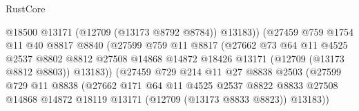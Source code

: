 \begin{lexlean}{RustCore}
\begin{coremodule}
                                      @18500
                                      @13171
                                      (@12709 (@13173 @8792 @8784))
                                      @13183))
                                  (@27459
                                    @759
                                    @1754
                                    @11
                                    @40
                                    @8817
                                    @8840
                                    (@27599
                                      @759
                                      @11
                                      @8817
                                      (@27662
                                        @73
                                        @64
                                        @11
                                        @4525
                                        @2537
                                        @8802
                                        @8812
                                        @27508
                                        @14868
                                        @14872
                                        @18426
                                        @13171
                                        (@12709 (@13173 @8812 @8803))
                                        @13183))
                                    (@27459
                                      @729
                                      @214
                                      @11
                                      @27
                                      @8838
                                      @2503
                                      (@27599
                                        @729
                                        @11
                                        @8838
                                        (@27662
                                          @171
                                          @64
                                          @11
                                          @4525
                                          @2537
                                          @8822
                                          @8833
                                          @27508
                                          @14868
                                          @14872
                                          @18119
                                          @13171
                                          (@12709 (@13173 @8833 @8823))
                                          @13183))

\end{coremodule}
\end{lexlean}
